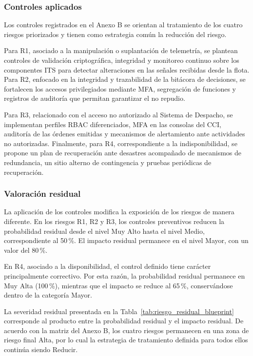 \subsubsection{Controles aplicados}

Los controles registrados en el Anexo B se orientan al tratamiento de los cuatro riesgos
priorizados y tienen como estrategia común la reducción del riesgo.

Para R1, asociado a la manipulación o suplantación de telemetría, se plantean controles de validación criptográfica, integridad y monitoreo continuo sobre los componentes ITS para detectar alteraciones en las señales recibidas desde la flota. Para R2, enfocado en la integridad y trazabilidad de la bitácora de decisiones, se fortalecen los accesos privilegiados mediante MFA, segregación de funciones y registros de auditoría que permitan garantizar el no repudio.

Para R3, relacionado con el acceso no autorizado al Sistema de Despacho, se implementan perfiles RBAC diferenciados, MFA en las consolas del CCI, auditoría de las órdenes emitidas y mecanismos de alertamiento ante actividades no autorizadas. Finalmente, para R4, correspondiente a la indisponibilidad, se propone un plan de recuperación ante desastres acompañado de mecanismos de redundancia, un sitio alterno de contingencia y pruebas periódicas de recuperación.


\subsubsection{Valoración residual}

La aplicación de los controles modifica la exposición de los riesgos de manera diferente. En
los riesgos R1, R2 y R3, los controles preventivos reducen la probabilidad residual desde el
nivel Muy Alto hasta el nivel Medio, correspondiente al 50\,\%. El impacto residual permanece
en el nivel Mayor, con un valor del 80\,\%.

En R4, asociado a la disponibilidad, el control definido tiene carácter principalmente
correctivo. Por esta razón, la probabilidad residual permanece en Muy Alta (100\,\%), mientras
que el impacto se reduce al 65\,\%, conservándose dentro de la categoría Mayor.

La severidad residual presentada en la Tabla~\ref{tab:riesgo_residual_blueprint} corresponde
al producto entre la probabilidad residual y el impacto residual. De acuerdo con la matriz del
Anexo B, los cuatro riesgos permanecen en una zona de riesgo final Alta, por lo cual
la estrategia de tratamiento definida para todos ellos continúa siendo Reducir.

